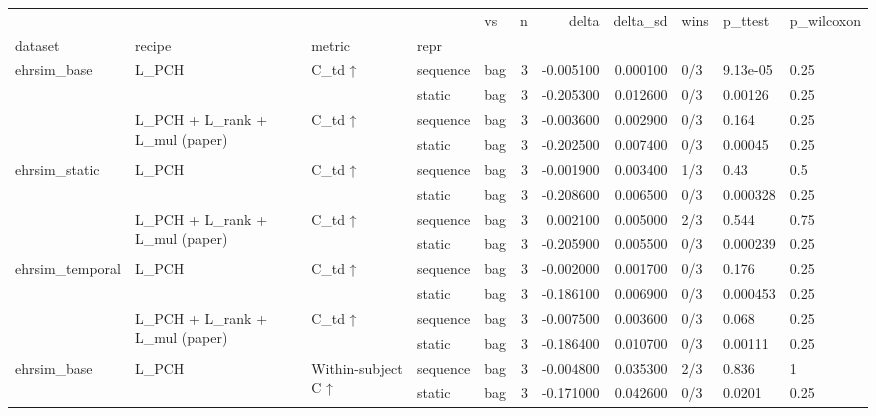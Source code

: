 \begin{tabular}{lllllrrrlll}
\toprule
 &  &  &  & vs & n & delta & delta\_sd & wins & p\_ttest & p\_wilcoxon \\
dataset & recipe & metric & repr &  &  &  &  &  &  &  \\
\midrule
\multirow[t]{4}{*}{ehrsim\_base} & \multirow[t]{2}{*}{L\_PCH} & \multirow[t]{2}{*}{C\_td ↑} & sequence & bag & 3 & -0.005100 & 0.000100 & 0/3 & 9.13e-05 & 0.25 \\
 &  &  & static & bag & 3 & -0.205300 & 0.012600 & 0/3 & 0.00126 & 0.25 \\
\cline{2-11} \cline{3-11}
 & \multirow[t]{2}{*}{L\_PCH + L\_rank + L\_mul (paper)} & \multirow[t]{2}{*}{C\_td ↑} & sequence & bag & 3 & -0.003600 & 0.002900 & 0/3 & 0.164 & 0.25 \\
 &  &  & static & bag & 3 & -0.202500 & 0.007400 & 0/3 & 0.00045 & 0.25 \\
\cline{1-11} \cline{2-11} \cline{3-11}
\multirow[t]{4}{*}{ehrsim\_static} & \multirow[t]{2}{*}{L\_PCH} & \multirow[t]{2}{*}{C\_td ↑} & sequence & bag & 3 & -0.001900 & 0.003400 & 1/3 & 0.43 & 0.5 \\
 &  &  & static & bag & 3 & -0.208600 & 0.006500 & 0/3 & 0.000328 & 0.25 \\
\cline{2-11} \cline{3-11}
 & \multirow[t]{2}{*}{L\_PCH + L\_rank + L\_mul (paper)} & \multirow[t]{2}{*}{C\_td ↑} & sequence & bag & 3 & 0.002100 & 0.005000 & 2/3 & 0.544 & 0.75 \\
 &  &  & static & bag & 3 & -0.205900 & 0.005500 & 0/3 & 0.000239 & 0.25 \\
\cline{1-11} \cline{2-11} \cline{3-11}
\multirow[t]{4}{*}{ehrsim\_temporal} & \multirow[t]{2}{*}{L\_PCH} & \multirow[t]{2}{*}{C\_td ↑} & sequence & bag & 3 & -0.002000 & 0.001700 & 0/3 & 0.176 & 0.25 \\
 &  &  & static & bag & 3 & -0.186100 & 0.006900 & 0/3 & 0.000453 & 0.25 \\
\cline{2-11} \cline{3-11}
 & \multirow[t]{2}{*}{L\_PCH + L\_rank + L\_mul (paper)} & \multirow[t]{2}{*}{C\_td ↑} & sequence & bag & 3 & -0.007500 & 0.003600 & 0/3 & 0.068 & 0.25 \\
 &  &  & static & bag & 3 & -0.186400 & 0.010700 & 0/3 & 0.00111 & 0.25 \\
\cline{1-11} \cline{2-11} \cline{3-11}
\multirow[t]{4}{*}{ehrsim\_base} & \multirow[t]{2}{*}{L\_PCH} & \multirow[t]{2}{*}{Within-subject C ↑} & sequence & bag & 3 & -0.004800 & 0.035300 & 2/3 & 0.836 & 1 \\
 &  &  & static & bag & 3 & -0.171000 & 0.042600 & 0/3 & 0.0201 & 0.25 \\

\end{tabular}
